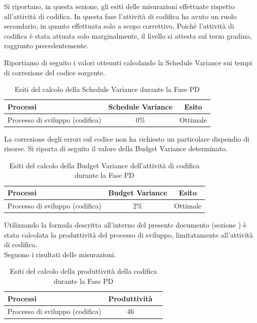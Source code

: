 		Si riportano, in questa sezione, gli esiti delle misurazioni effettuate rispetto all'attività di codifica. In questa fase l'attività di codifica ha avuto un ruolo secondario, in quanto effettuata solo a scopo correttivo.
			Poichè l'attività di codifica è stata attuata solo marginalmente, il livello  si attesta sul terzo gradino, raggiunto precedentemente.
			
			 Riportiamo di seguito i valori ottenuti calcolando la Schedule Variance sui tempi di correzione del codice sorgente.
			\begin{table}[H]
				\centering
				\begin{tabu}{| l | c | c |}
					\hline
						Processi 						& Schedule Variance	& Esito		\\ \hline \hline
						Processo di sviluppo (codifica) & 0\% & Ottimale \\ \hline
				\end{tabu}
				\caption{Esiti del calcolo della Schedule Variance durante la Fase PD}
			\end{table}	
						
			La correzione degli errori sul codice non ha richiesto un particolare dispendio di risorse. Si riporta di seguito il valore della Budget Variance determinato.		\\
			\begin{table}[H]
			\centering
				\begin{tabu}{| l | c | c |}
					\hline
						Processi 						& Budget Variance	& Esito		\\ \hline \hline
						Processo di sviluppo (codifica) & 2\% & Ottimale \\ \hline
				\end{tabu}
				\caption{Esiti del calcolo della Budget Variance dell'attività di codifica durante la Fase PD}
			\end{table}	
							
			Utilizzando la formula descritta all'interno del presente documento (sezione ) è stata calcolata la produttività del processo di sviluppo, limitatamente all'attività di codifica. \\
			Seguono i risultati delle misurazioni.
			\\ 
			\begin{table}[H]
				\centering
				\begin{tabu}{| l | c | c |}
					\hline
						Processi 						& Produttività		\\ \hline \hline
						Processo di sviluppo (codifica) & 46   \\ \hline
				\end{tabu}
				\caption{Esiti del calcolo della produttività della codifica durante la Fase PD}
			\end{table}	
			
